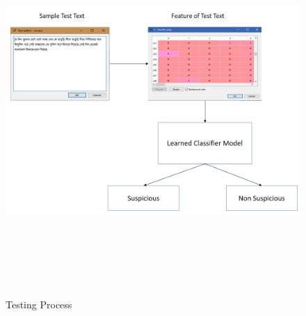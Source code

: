 \begin{figure}[h!]
    \centering
    \includegraphics[width=15cm,height=14cm]{Figures/testing_phase.PNG}
    \caption{Testing Process}
    \label{fig:TEP}
\end{figure}
